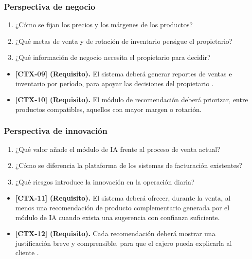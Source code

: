 \documentclass[onecolumn,12pt]{IEEEtran}
\begin{document}
\subsubsection{Perspectiva de negocio}
\begin{enumerate}
  \item ¿C\'omo se fijan los precios y los m\'argenes de los productos?
  \item ¿Qu\'e metas de venta y de rotaci\'on de inventario persigue el propietario?
  \item ¿Qu\'e informaci\'on de negocio necesita el propietario para decidir?
\end{enumerate}
\begin{itemize}
  \item \textbf{[CTX-09] (Requisito).} El sistema deber\'a generar reportes de ventas e inventario por per\'iodo, para apoyar las decisiones del propietario \cite{iso25010}.
  \item \textbf{[CTX-10] (Requisito).} El m\'odulo de recomendaci\'on deber\'a priorizar, entre productos compatibles, aquellos con mayor margen o rotaci\'on.
\end{itemize}

\subsubsection{Perspectiva de innovaci\'on}
\begin{enumerate}
  \item ¿Qu\'e valor a\~nade el m\'odulo de IA frente al proceso de venta actual?
  \item ¿C\'omo se diferencia la plataforma de los sistemas de facturaci\'on existentes?
  \item ¿Qu\'e riesgos introduce la innovaci\'on en la operaci\'on diaria?
\end{enumerate}
\begin{itemize}
  \item \textbf{[CTX-11] (Requisito).} El sistema deber\'a ofrecer, durante la venta, al menos una recomendaci\'on de producto complementario generada por el m\'odulo de IA cuando exista una sugerencia con confianza suficiente.
  \item \textbf{[CTX-12] (Requisito).} Cada recomendaci\'on deber\'a mostrar una justificaci\'on breve y comprensible, para que el cajero pueda explicarla al cliente \cite{swebok4}.
\end{itemize}
\end{document}
